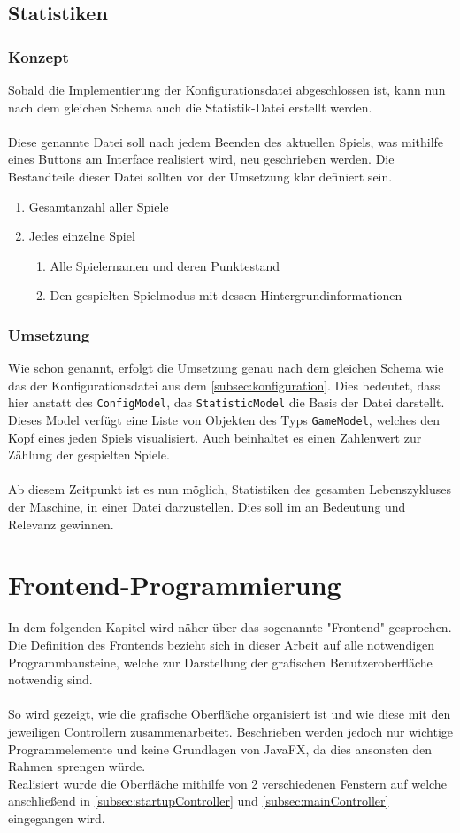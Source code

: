 \subsection{Statistiken}
\subsubsection{Konzept}
Sobald die Implementierung der Konfigurationsdatei abgeschlossen ist, kann nun nach dem gleichen Schema auch die Statistik-Datei erstellt werden.\\\\
Diese genannte Datei soll nach jedem Beenden des aktuellen Spiels, was mithilfe eines Buttons am Interface realisiert wird, neu geschrieben werden.
Die Bestandteile dieser Datei sollten vor der Umsetzung klar definiert sein.
\begin{enumerate}
\item Gesamtanzahl aller Spiele
\item Jedes einzelne Spiel
\begin{enumerate}
\item Alle Spielernamen und deren Punktestand
\item Den gespielten Spielmodus mit dessen Hintergrundinformationen
\end{enumerate}
\end{enumerate}
\subsubsection{Umsetzung}
Wie schon genannt, erfolgt die Umsetzung genau nach dem gleichen Schema wie das der Konfigurationsdatei aus dem \autoref{subsec:konfiguration}.
Dies bedeutet, dass hier anstatt des \lstinline[style=java]{ConfigModel}, das \lstinline[style=java]{StatisticModel} die Basis der Datei darstellt.
Dieses Model verfügt eine Liste von Objekten des Typs \lstinline[style=java]{GameModel}, welches den Kopf eines jeden Spiels visualisiert.
Auch beinhaltet es einen Zahlenwert zur Zählung der gespielten Spiele.\\\\
Ab diesem Zeitpunkt ist es nun möglich, Statistiken des gesamten Lebenszykluses der Maschine, in einer Datei darzustellen.
Dies soll im  an Bedeutung und Relevanz gewinnen.
\newpage
\section{Frontend-Programmierung}
In dem folgenden Kapitel wird näher über das sogenannte "Frontend" gesprochen.
Die Definition des Frontends bezieht sich in dieser Arbeit auf alle notwendigen Programmbausteine, welche zur Darstellung der grafischen Benutzeroberfläche notwendig sind.\\\\
So wird gezeigt, wie die grafische Oberfläche organisiert ist und wie diese mit den jeweiligen Controllern zusammenarbeitet.
Beschrieben werden jedoch nur wichtige Programmelemente und keine Grundlagen von JavaFX, da dies ansonsten den Rahmen sprengen würde.\\
Realisiert wurde die Oberfläche mithilfe von 2 verschiedenen Fenstern auf welche anschließend in \autoref{subsec:startupController} und \autoref{subsec:mainController} eingegangen wird.
